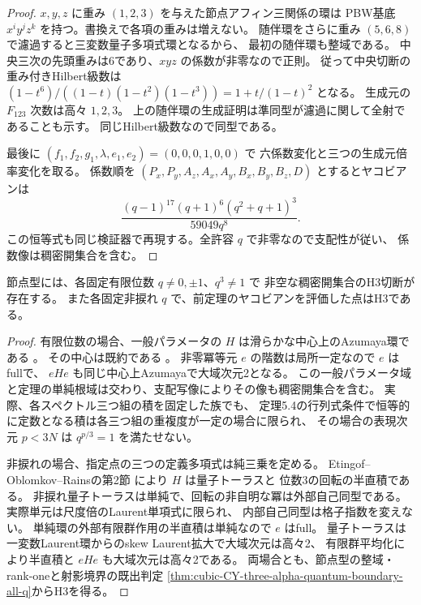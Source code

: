 \begin{proof}
$x,y,z$ に重み $(1,2,3)$ を与えた節点アフィン三関係の環は
PBW基底 $x^iy^jz^k$ を持つ。書換えで各項の重みは増えない。
随伴環をさらに重み $(5,6,8)$ で濾過すると三変数量子多項式環となるから、
最初の随伴環も整域である。
中央三次の先頭重みは6であり、$xyz$ の係数が非零なので正則。
従って中央切断の重み付きHilbert級数は
$(1-t^6)/((1-t)(1-t^2)(1-t^3))=1+t/(1-t)^2$ となる。
生成元の $F_{123}$ 次数は高々 $1,2,3$。
上の随伴環の生成証明は準同型が濾過に関して全射であることも示す。
同じHilbert級数なので同型である。

最後に $(f_1,f_2,g_1,\lambda,e_1,e_2)=(0,0,0,1,0,0)$ で
六係数変化と三つの生成元倍率変化を取る。
係数順を $(P_x,P_y,A_z,A_x,A_y,B_x,B_y,B_z,D)$ とするとヤコビアンは
\[
 \frac{(q-1)^{17}(q+1)^6(q^2+q+1)^3}{59049q^8}.
\]
この恒等式も同じ検証器で再現する。全許容 $q$ で非零なので支配性が従い、
係数像は稠密開集合を含む。
\end{proof}

\begin{corollary}\label{cor:cubic-CY-three-alpha-nodal-E6-H3}
節点型には、各固定有限位数 $q\ne0,\pm1$、$q^3\ne1$ で
非空な稠密開集合のH3切断が存在する。
また各固定非捩れ $q$ で、前定理のヤコビアンを評価した点はH3である。
\end{corollary}
\begin{proof}
有限位数の場合、一般パラメータの $H$ は滑らかな中心上のAzumaya環である
\cite[定理5.6、5.9]{EtingofOblomkovRainsGDaha}。
その中心は既約である \cite[命題6.6]{EtingofOblomkovRainsGDaha}。
非零冪等元 $e$ の階数は局所一定なので $e$ はfullで、
$eHe$ も同じ中心上Azumayaで大域次元2となる。
この一般パラメータ域と定理の単純根域は交わり、支配写像によりその像も稠密開集合を含む。
実際、各スペクトル三つ組の積を固定した族でも、
定理5.4の行列式条件で恒等的に定数となる積は各三つ組の重複度が一定の場合に限られ、
その場合の表現次元 $p<3N$ は $q^{p/3}=1$ を満たせない。

非捩れの場合、指定点の三つの定義多項式は純三乗を定める。
Etingof--Oblomkov--Rainsの第2節
\cite{EtingofOblomkovRainsGDaha}により $H$ は量子トーラスと
位数3の回転の半直積である。
非捩れ量子トーラスは単純で、回転の非自明な冪は外部自己同型である。
実際単元は尺度倍のLaurent単項式に限られ、
内部自己同型は格子指数を変えない。
単純環の外部有限群作用の半直積は単純なので $e$ はfull。
量子トーラスは一変数Laurent環からのskew Laurent拡大で大域次元は高々2、
有限群平均化により半直積と $eHe$ も大域次元は高々2である。
両場合とも、節点型の整域・rank-oneと射影境界の既出判定
\ref{thm:cubic-CY-three-alpha-quantum-boundary-all-q}からH3を得る。
\end{proof}

